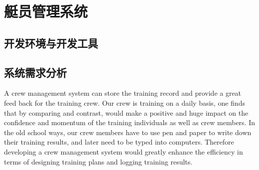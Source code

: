 \chapter{艇员管理系统}

\section{开发环境与开发工具}

\section{系统需求分析}%


A crew management system can store the training record and provide a great feed
back for the training crew. Our crew is training on a daily basis, one finds
that by comparing and contrast, would make a positive and huge impact on the
confidence and momentum of the training individuals as well as crew members.
In the old school ways, our crew members have to use pen and paper to write down
their training results, and later need to be typed into computers. Therefore
developing a crew management system would greatly enhance the efficiency in
terms of designing training plans and logging training results.


